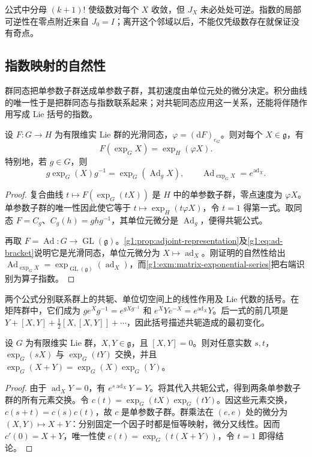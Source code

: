 公式中分母 \((k+1)!\) 使级数对每个 \(X\) 收敛，但 \(J_X\) 未必处处可逆。指数的局部可逆性在零点附近来自 \(J_0=I\)；离开这个邻域以后，不能仅凭级数存在就保证没有奇点。

\subsection{指数映射的自然性}
\label{g1:subsec:1602:03}

群同态把单参数子群送成单参数子群，其初速度由单位元处的微分决定。积分曲线的唯一性于是把群同态与指数联系起来；对共轭同态应用这一关系，还能将伴随作用写成 Lie 括号的指数。

\begin{proposition}\label{g1:prop:exponential-naturality}
	设 \(F:G\to H\) 为有限维实 Lie 群的光滑同态，\(\varphi=(\mathrm{d}F)_{e_G}\)。则对每个 \(X\in\mathfrak g\)，有
	\begin{equation}\label{g1:eq:exponential-homomorphism}
		F(\exp_GX)=\exp_H(\varphi X).
	\end{equation}
	特别地，若 \(g\in G\)，则
	\begin{equation}\label{g1:eq:exponential-conjugation}
		g\exp_G(X)g^{-1}=\exp_G(\operatorname{Ad}_gX),\qquad
		\operatorname{Ad}_{\exp_GX}=e^{\operatorname{ad}_X}.
	\end{equation}
\end{proposition}
\begin{proof}
	复合曲线 \(t\mapsto F(\exp_G(tX))\) 是 \(H\) 中的单参数子群，零点速度为 \(\varphi X\)。单参数子群的唯一性因此使它等于 \(t\mapsto\exp_H(t\varphi X)\)，令 \(t=1\) 得第一式。取同态 \(F=C_g\)、\(C_g(h)=ghg^{-1}\)，其单位元微分是 \(\operatorname{Ad}_g\)，便得共轭公式。

	再取 \(F=\operatorname{Ad}:G\to\operatorname{GL}(\mathfrak g)\)。\cref{g1:prop:adjoint-representation}及\eqref{g1:eq:ad-bracket}说明它是光滑同态，单位元微分为 \(X\mapsto\operatorname{ad}_X\)。刚证明的自然性给出 \(\operatorname{Ad}_{\exp_GX}=\exp_{\operatorname{GL}(\mathfrak g)}(\operatorname{ad}_X)\)，而\cref{g1:exm:matrix-exponential-series}把右端识别为算子指数。
\end{proof}

两个公式分别联系群上的共轭、单位切空间上的线性作用及 Lie 代数的括号。在矩阵群中，它们成为 \(g e^Xg^{-1}=e^{gXg^{-1}}\) 和 \(e^XYe^{-X}=e^{\operatorname{ad}_X}Y\)。后一式的前几项是 \(Y+[X,Y]+\tfrac12[X,[X,Y]]+\cdots\)，因此括号描述共轭造成的最初变化。

\begin{corollary}\label{g1:cor:commuting-exponentials}
	设 \(G\) 为有限维实 Lie 群，\(X,Y\in\mathfrak g\)，且 \([X,Y]=0\)。则对任意实数 \(s,t\)，\(\exp_G(sX)\) 与 \(\exp_G(tY)\) 交换，并且 \(\exp_G(X+Y)=\exp_G(X)\exp_G(Y)\)。
\end{corollary}
\begin{proof}
	由于 \(\operatorname{ad}_XY=0\)，有 \(e^{s\operatorname{ad}_X}Y=Y\)。将其代入共轭公式，得到两条单参数子群的所有元素交换。令 \(c(t)=\exp_G(tX)\exp_G(tY)\)。因这些元素交换，\(c(s+t)=c(s)c(t)\)，故 \(c\) 是单参数子群。群乘法在 \((e,e)\) 处的微分为 \((X,Y)\mapsto X+Y\)：分别固定一个因子时都是恒等映射，微分又线性。因而 \(c'(0)=X+Y\)，唯一性使 \(c(t)=\exp_G(t(X+Y))\)，令 \(t=1\) 即得结论。
\end{proof}

